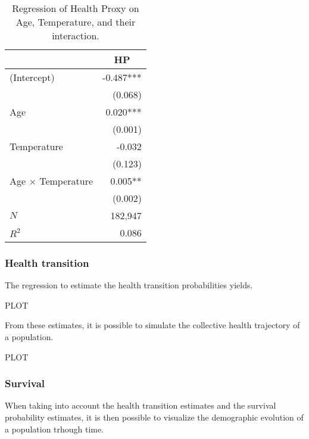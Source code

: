 \documentclass{article}
\begin{document}
\begin{table}[H]
    \begin{center}
        \begin{tabular}{lr}
            \toprule
                                    & \multicolumn{1}{c}{HP} \\ 
            \midrule
            (Intercept)              &              -0.487*** \\ 
                                    &                (0.068) \\ 
            Age                      &               0.020*** \\ 
                                    &                (0.001) \\ 
            Temperature              &                 -0.032 \\ 
                                    &                (0.123) \\ 
            Age $\times$ Temperature &                0.005** \\ 
                                    &                (0.002) \\ 
            \midrule
            $N$                      &                182,947 \\ 
            $R^2$                    &                  0.086 \\ 
            \bottomrule
        \end{tabular}
        \caption{Regression of Health Proxy on Age, Temperature, and their interaction.}
    \end{center}
\end{table}

\subsubsection{Health transition}

The regression to estimate the health transition probabilities
yields. 

PLOT

From these estimates, it is possible to simulate the collective 
health trajectory of a population.

PLOT

\subsubsection{Survival}

When taking into account the health transition estimates
and the survival probability estimates, it is then possible
to visualize the demographic evolution of a population trhough time.
\end{document}
